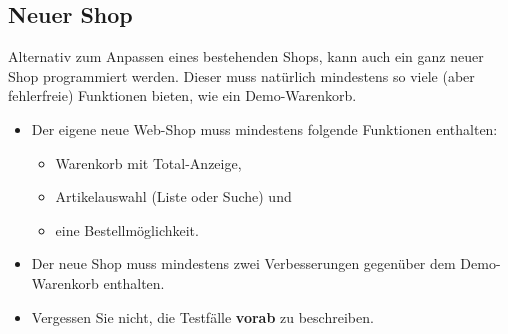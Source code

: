 %


\subsection{Neuer Shop}

Alternativ zum Anpassen eines bestehenden Shops, kann  auch ein
ganz neuer Shop programmiert werden. Dieser muss natürlich mindestens so viele
(aber fehlerfreie) Funktionen bieten, wie ein Demo-Warenkorb.

\begin{itemize}
 \item Der eigene neue Web-Shop muss mindestens folgende Funktionen enthalten:
   \begin{itemize}
     \item Warenkorb mit Total-Anzeige,
     \item Artikelauswahl (Liste oder Suche) und
     \item eine Bestellmöglichkeit.
   \end{itemize}
 \item Der neue Shop muss mindestens zwei Verbesserungen gegenüber dem Demo-Warenkorb enthalten.
 \item Vergessen Sie nicht, die Testfälle \textbf{vorab} zu beschreiben.
\end{itemize}


